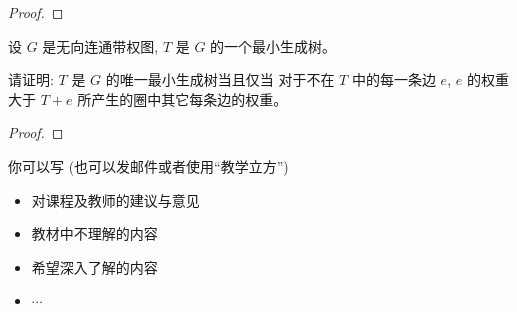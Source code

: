 \documentclass[a4paper, justified]{tufte-handout}
\begin{document}
\begin{proof}
\end{proof}

\begin{problem}
  设 $G$ 是无向连通带权图, $T$ 是 $G$ 的一个最小生成树。

  \noindent 请证明: $T$ 是 $G$ 的唯一最小生成树当且仅当
  对于不在 $T$ 中的每一条边 $e$,
  $e$ 的权重大于 $T + e$ 所产生的圈中其它每条边的权重。
\end{problem}

\begin{proof}
\end{proof}

\begin{problem}[\score{$-10$}]
\end{problem}


\begincorrection

\beginfb

你可以写 (也可以发邮件或者使用``教学立方'')
\begin{itemize}
  \item 对课程及教师的建议与意见
  \item 教材中不理解的内容
  \item 希望深入了解的内容
  \item $\cdots$
\end{itemize}
\end{document}

